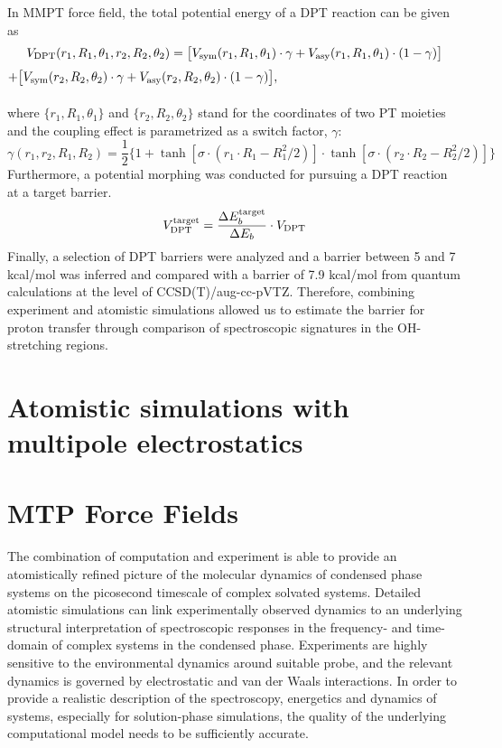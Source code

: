 \documentclass[journal=jacsat,manuscript=article]{achemso}
\begin{document}
In MMPT force field, the total potential energy of a DPT reaction can be given as
\begin{equation}
V_{\rm DPT} (r_1,R_1,\theta_1,r_2,R_2,\theta_2)=\big[V_{\rm 
sym}(r_1,R_1,\theta_1)\cdot\gamma+V_{\rm asy}(r_1,R_1,\theta_1)\cdot(1-\gamma)\big]
\label{eq:edpt}
\end{equation}
{\centering$ +\big[V_{\rm sym}(r_2,R_2,\theta_2)\cdot\gamma+V_{\rm asy}(r_2,R_2,\theta_2)\cdot(1-\gamma)\big], $}
\\
\\
\noindent
where $ \{r_1,R_1,\theta_1\} $ and $ \{r_2,R_2,\theta_2\} $ stand for the coordinates of two PT moieties and the coupling effect is parametrized as a switch factor, $ \gamma $:
\begin{equation}
\gamma(r_1,r_2,R_1,R_2)=\frac{1}{2}\big\{1+\tanh[\sigma\cdot(r_1\cdot
  R_1-R_1^2/2)]\cdot\tanh[\sigma\cdot(r_2\cdot R_2-R_2^2/2)]\big\}
\label{eq:gamma}
\end{equation}
\noindent
Furthermore, a potential morphing was conducted for pursuing a DPT reaction at a target barrier.
\begin{equation}
V_{\rm DPT}^{\rm target}=\frac{\Delta E_b^{\rm target}}{\Delta E_b}\cdot V_{\rm DPT}
\label{eq:morph}
\end{equation}
Finally, a selection of DPT barriers were analyzed and a barrier between 5 and 7 kcal/mol was inferred and compared with a barrier of 7.9 kcal/mol from quantum calculations at the level of CCSD(T)/aug-cc-pVTZ.
Therefore, combining experiment and atomistic simulations allowed us to estimate
the barrier for proton transfer through comparison of spectroscopic signatures in the OH-stretching regions. 


\section{Atomistic simulations with multipole electrostatics}
    
\section{MTP Force Fields}
\noindent
The combination of computation and experiment is able to provide an atomistically refined picture of the molecular dynamics of condensed phase systems on the picosecond timescale of complex solvated systems. Detailed atomistic simulations can link experimentally observed dynamics to an underlying structural interpretation of spectroscopic responses in the frequency- and time-domain of complex systems in the condensed phase. Experiments are highly sensitive to the environmental dynamics around suitable probe, and the relevant dynamics is governed by electrostatic and van der Waals interactions. 
In order to provide a realistic description of the spectroscopy, energetics and dynamics of systems, especially for solution-phase simulations, the quality of the underlying computational model needs to be sufficiently accurate.
\end{document}
